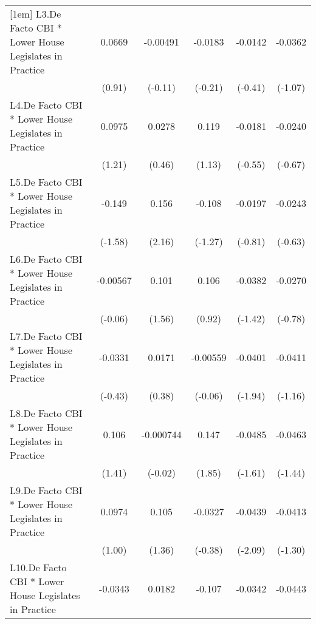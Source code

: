 {\begin{tabular}{l*{5}{c}}
[1em]
L3.De Facto CBI * Lower House Legislates in Practice&   0.0669         & -0.00491         &  -0.0183         &  -0.0142         &  -0.0362         \\
                &   (0.91)         &  (-0.11)         &  (-0.21)         &  (-0.41)         &  (-1.07)         \\
[1em]
L4.De Facto CBI * Lower House Legislates in Practice&   0.0975         &   0.0278         &    0.119         &  -0.0181         &  -0.0240         \\
                &   (1.21)         &   (0.46)         &   (1.13)         &  (-0.55)         &  (-0.67)         \\
[1em]
L5.De Facto CBI * Lower House Legislates in Practice&   -0.149         &    0.156\sym{*}  &   -0.108         &  -0.0197         &  -0.0243         \\
                &  (-1.58)         &   (2.16)         &  (-1.27)         &  (-0.81)         &  (-0.63)         \\
[1em]
L6.De Facto CBI * Lower House Legislates in Practice& -0.00567         &    0.101         &    0.106         &  -0.0382         &  -0.0270         \\
                &  (-0.06)         &   (1.56)         &   (0.92)         &  (-1.42)         &  (-0.78)         \\
[1em]
L7.De Facto CBI * Lower House Legislates in Practice&  -0.0331         &   0.0171         & -0.00559         &  -0.0401         &  -0.0411         \\
                &  (-0.43)         &   (0.38)         &  (-0.06)         &  (-1.94)         &  (-1.16)         \\
[1em]
L8.De Facto CBI * Lower House Legislates in Practice&    0.106         &-0.000744         &    0.147         &  -0.0485         &  -0.0463         \\
                &   (1.41)         &  (-0.02)         &   (1.85)         &  (-1.61)         &  (-1.44)         \\
[1em]
L9.De Facto CBI * Lower House Legislates in Practice&   0.0974         &    0.105         &  -0.0327         &  -0.0439\sym{*}  &  -0.0413         \\
                &   (1.00)         &   (1.36)         &  (-0.38)         &  (-2.09)         &  (-1.30)         \\
[1em]
L10.De Facto CBI * Lower House Legislates in Practice&  -0.0343         &   0.0182         &   -0.107         &  -0.0342         &  -0.0443         \\

\end{tabular}}
